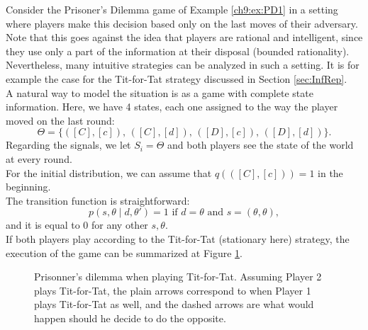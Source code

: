 \begin{example}
Consider the Prisoner's Dilemma game of Example \ref{ch9:ex:PD1} in a setting where players make this decision based only on the last moves of their adversary.
Note that this goes against the idea that players are rational and intelligent, since they use only a part of the information at their disposal (bounded rationality).
Nevertheless, many intuitive strategies can be analyzed in such a setting. It is for example the case for the Tit-for-Tat strategy discussed in Section \ref{sec:InfRep}.\\
A natural way to model the situation is as a game with complete state information.
Here, we have 4 states, each one assigned to the way the player moved on the last round:
$$ \Theta = \{([C],[c]), \,  ([C],[d]), \, ([D],[c]), \, ([D], [d]) \}. $$
Regarding the signals, we let $S_i = \Theta $ and both players see the state of the world at every round.\\
For the initial distribution, we can assume that $q( ([C],[c]) ) = 1$ in the beginning. \\
The transition function is straightforward:
$$ p(s, \theta \mid d, \theta') = 1 \text{ if } d = \theta \text{ and } s = (\theta,\theta), $$
and it is equal to $0$ for any other $s, \theta$.\\
If both players play according to the Tit-for-Tat (stationary here) strategy, the execution of the game can be summarized at Figure \ref{fig:Tit-for-Tat}.
\begin{figure}[!ht]
\centering
{}
\caption{Prisonner's dilemma when playing Tit-for-Tat. Assuming Player 2 plays Tit-for-Tat, the plain arrows correspond to when Player 1 plays Tit-for-Tat as well, and the dashed arrows are what would happen should he decide to do the opposite.}
\label{fig:Tit-for-Tat}
\end{figure}
\label{ex:stationaryGame}
\end{example}

